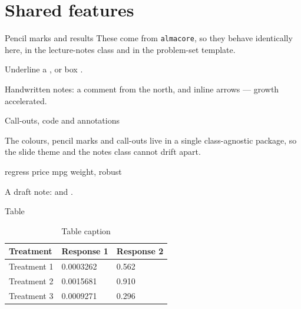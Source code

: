\documentclass[aspectratio=169]{beamer}
\begin{document}
\section{Shared features}

\begin{frame}{Pencil marks and results}
  These come from \texttt{almacore}, so they behave identically here, in the
  lecture-notes class and in the problem-set template.

  \medskip
  Underline a , or box .

  \medskip
  Handwritten notes: {\hand a comment from the north}, and inline arrows ---
  growth \handarrowup{} accelerated.


\end{frame}

\begin{frame}[fragile]{Call-outs, code and annotations}
  \begin{notebox}
    The colours, pencil marks and call-outs live in a single class-agnostic
    package, so the slide theme and the notes class cannot drift apart.
  \end{notebox}

  \begin{code}
regress price mpg weight, robust
  \end{code}

  A draft note:  and .
\end{frame}

\begin{frame}{Table}
  \begin{table}
    \centering
    \begin{tabular}{lll}
      \toprule
      \textbf{Treatment} & \textbf{Response 1} & \textbf{Response 2} \\
      \midrule
      Treatment 1 & 0.0003262 & 0.562 \\
      Treatment 2 & 0.0015681 & 0.910 \\
      Treatment 3 & 0.0009271 & 0.296 \\
      \bottomrule
    \end{tabular}
    \caption{Table caption}
  \end{table}
\end{frame}
\end{document}
